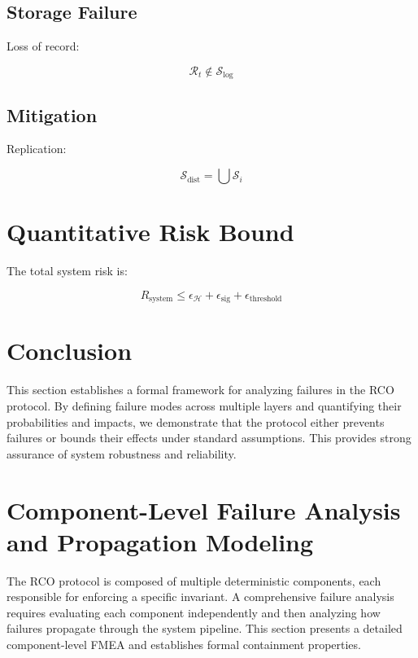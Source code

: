 \subsection{Storage Failure}

Loss of record:

\begin{equation}
\mathcal{R}_t \notin \mathcal{S}_{\text{log}}
\end{equation}

\subsection{Mitigation}

Replication:

\begin{equation}
\mathcal{S}_{\text{dist}} = \bigcup \mathcal{S}_i
\end{equation}

\section{Quantitative Risk Bound}

The total system risk is:

\begin{equation}
R_{\text{system}} \leq \epsilon_{\mathcal{H}} + \epsilon_{\text{sig}} + \epsilon_{\text{threshold}}
\end{equation}

\section{Conclusion}

This section establishes a formal framework for analyzing failures in the RCO protocol. By defining failure modes across multiple layers and quantifying their probabilities and impacts, we demonstrate that the protocol either prevents failures or bounds their effects under standard assumptions. This provides strong assurance of system robustness and reliability.

\section{Component-Level Failure Analysis and Propagation Modeling}

The RCO protocol is composed of multiple deterministic components, each responsible for enforcing a specific invariant. A comprehensive failure analysis requires evaluating each component independently and then analyzing how failures propagate through the system pipeline. This section presents a detailed component-level FMEA and establishes formal containment properties.

